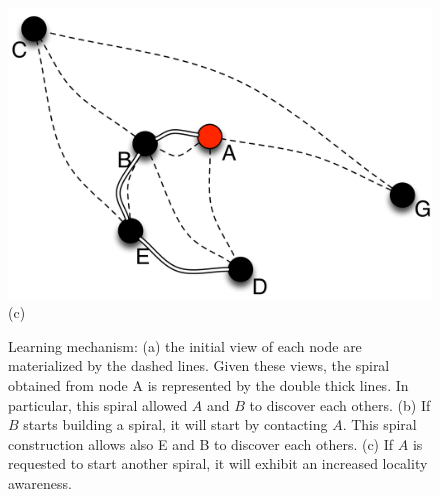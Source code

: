 \begin{figure}[ht]
{\begin{center}
{\begin{minipage}{.3\linewidth}
	  \begin{center}
	    \includegraphics[width=1.05\linewidth]{Figures/learning3.png}\\(c)
	  \end{center}
	\end{minipage}
	\caption{Learning mechanism: (a) the initial view of each node are
          materialized by the dashed lines. Given these views, the spiral obtained from
          node A is represented by the double thick lines. In particular, this spiral
          allowed $A$ and $B$ to discover each others. (b) If $B$ starts building a
          spiral, it will start by contacting $A$. This spiral construction allows also E
          and B to discover each others. (c) If $A$ is requested to start another spiral,
          it will exhibit an increased locality awareness.\label{fig:learning}}  }
      \end{center}
}
\end{figure}

